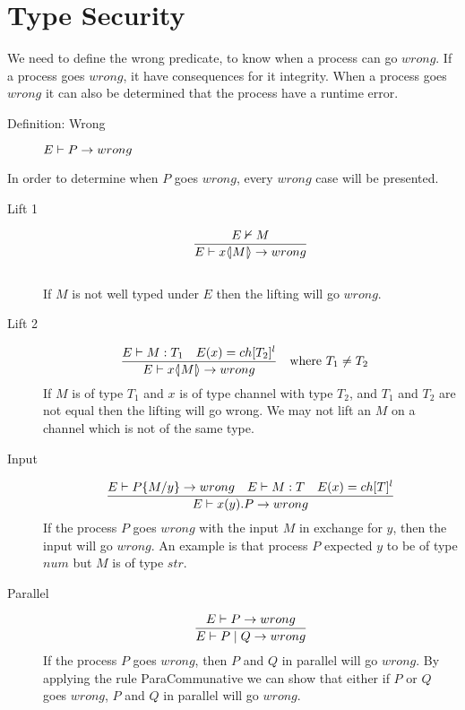 \section{Type Security}
We need to define the wrong predicate, to know when a process can go $wrong$. If a process goes $wrong$, it have consequences for it integrity. When a process goes $wrong$ it can also be determined that the process have a runtime error.
\begin{description}
    \item[Definition: Wrong] $E \vdash P \rightarrow wrong$
\end{description}
    
    In order to determine when $P$ goes $wrong$, every $wrong$ case will be presented.
\begin{description}
    \item[Lift 1] \begin{align*}
        \frac{E \nvdash M}{E \vdash x \langle \! | M | \! \rangle \rightarrow wrong}
    \end{align*}\\
    If $M$ is not well typed under $E$ then the lifting will go $wrong$.\\
        
    \item[Lift 2] \begin{align*}
            \frac{E \vdash M:T_1 \quad E(x)=ch[T_2]^l}{E \vdash x \langle \! | M | \! \rangle \rightarrow wrong} &\quad \text{where}\ T_1 \neq T_2
    \end{align*}
    If $M$ is of type $T_1$ and $x$ is of type channel with type $T_2$, and $T_1$ and $T_2$ are not equal then the lifting will go wrong. We may not lift an $M$ on a channel which is not of the same type.\\

    \item[Input] \begin{align*}
        \frac{E \vdash P\{ M/ y\} \rightarrow wrong \quad E \vdash M:T \quad E(x)= ch[T]^l} {E \vdash x(y).P \rightarrow wrong}\\
    \end{align*}
    If the process $P$ goes $wrong$ with the input $M$ in exchange for $y$, then the input will go $wrong$. An example is that process $P$ expected $y$ to be of type $num$ but $M$ is of type $str$.\\

    \item[Parallel] \begin{align*}
        \frac{E \vdash P \rightarrow wrong}{E \vdash P \mid Q \rightarrow wrong}
    \end{align*}
    If the process $P$ goes $wrong$, then $P$ and $Q$ in parallel will go $wrong$. By applying the rule ParaCommunative we can show that either if $P$ or $Q$ goes $wrong$, $P$ and $Q$ in parallel will go $wrong$.\\


\end{description}
